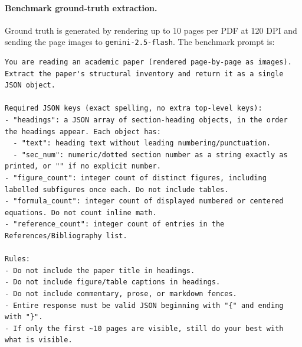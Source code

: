 \documentclass[10pt]{article}
\begin{document}
\paragraph{Benchmark ground-truth extraction.}
Ground truth is generated by rendering up to 10 pages per PDF at 120 DPI and sending the page images to \texttt{gemini-2.5-flash}. The benchmark prompt is:
\begin{lstlisting}[style=terminal]
You are reading an academic paper (rendered page-by-page as images). Extract the paper's structural inventory and return it as a single JSON object.

Required JSON keys (exact spelling, no extra top-level keys):
- "headings": a JSON array of section-heading objects, in the order the headings appear. Each object has:
  - "text": heading text without leading numbering/punctuation.
  - "sec_num": numeric/dotted section number as a string exactly as printed, or "" if no explicit number.
- "figure_count": integer count of distinct figures, including labelled subfigures once each. Do not include tables.
- "formula_count": integer count of displayed numbered or centered equations. Do not count inline math.
- "reference_count": integer count of entries in the References/Bibliography list.

Rules:
- Do not include the paper title in headings.
- Do not include figure/table captions in headings.
- Do not include commentary, prose, or markdown fences.
- Entire response must be valid JSON beginning with "{" and ending with "}".
- If only the first ~10 pages are visible, still do your best with what is visible.
\end{lstlisting}
\end{document}
